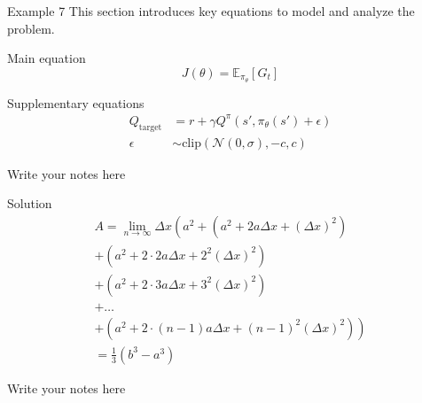 \documentclass[aspectratio=169]{beamer}
\begin{document}
    \begin{frame}{Example 7}
        This section introduces key equations to model and analyze the problem.

        \begin{alertblock}{Main equation}
            \begin{equation*}
                J(\theta) = \mathbb{E}_{\pi_\theta}[G_t]
            \end{equation*}
        \end{alertblock}

        \begin{alertblock}{Supplementary equations}
            \begin{align}
                Q_{\mathrm{target}} &= r + \gamma Q^\pi(s', \pi_\theta(s') + \epsilon)\\
                \epsilon &\sim \mathrm{clip}(\mathcal{N}(0, \sigma), -c, c)
            \end{align}
        \end{alertblock}

        \begin{note}
            {Write your notes here}
        \end{note}
    \end{frame}

    \begin{frame}
        \begin{alertblock}{Solution}
            \begin{multline}
                A=\lim_{n\rightarrow\infty}\Delta x\left(a^{2}+\left(a^{2}+2a\Delta x+\left(\Delta x\right)^{2}\right)\right.\\
                +\left(a^{2}+2\cdot2a\Delta x+2^{2}\left(\Delta x\right)^{2}\right)\\
                +\left(a^{2}+2\cdot3a\Delta x+3^{2}\left(\Delta x\right)^{2}\right)\\
                +\ldots\\
                \left.+\left(a^{2}+2\cdot(n-1)a\Delta x+(n-1)^{2}\left(\Delta x\right)^{2}\right)\right)\\
                =\frac{1}{3}\left(b^{3}-a^{3}\right)
            \end{multline}
        \end{alertblock}

        \begin{note}
            {Write your notes here}
        \end{note}
    \end{frame}
\end{document}
